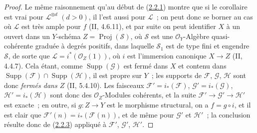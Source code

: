 \begin{proof}
Le même raisonnement qu'au début de
(\hyperref[III.2.2.1-fr]{2.2.1}) montre que si le corollaire est vrai
pour $\mathcal L^{\otimes d}$ $(d>0)$, il l'est aussi pour $\mathcal L$~;
on peut donc se borner au cas où $\mathcal L$ est très ample pour $f$
(II, 4.6.11), et par suite on peut identifier $X$ à un ouvert dans un
$Y$-schéma $Z=\operatorname{Proj}(\mathcal S)$, où $\mathcal S$ est une
$\mathcal O_Y$-Algèbre quasi-cohérente graduée à degrés positifs, dans
laquelle $\mathcal S_1$ est de type fini et engendre $\mathcal S$, de
sorte que $\mathcal L=i^*(\mathcal O_Z(1))$, où $i$ est l'immersion
canonique $X\to Z$ (II, 4.4.7). Cela étant, comme
$\operatorname{Supp}(\mathcal G)$ est fermé dans $X$ et contenu dans
$\operatorname{Supp}(\mathcal F)\cap\operatorname{Supp}(\mathcal H)$, il
est propre sur $Y$~; les supports de $\mathcal F$, $\mathcal G$,
$\mathcal H$ sont donc \emph{fermés dans $Z$} (II, 5.4.10). Les faisceaux
$\mathcal F'=i_*(\mathcal F)$, $\mathcal G'=i_*(\mathcal G)$,
$\mathcal H'=i_*(\mathcal H)$ sont donc des $\mathcal O_Z$-Modules
cohérents, et la suite $\mathcal F'\to\mathcal G'\to\mathcal H'$ est
exacte~; en outre, si $g:Z\to Y$ est le morphisme structural, on a
$f=g\circ i$, et il est clair que
$\mathcal F'(n)=i_*(\mathcal F(n))$, et de même pour $\mathcal G'$ et
$\mathcal H'$~; la conclusion résulte donc de
(\hyperref[III.2.2.3-fr]{2.2.3}) appliqué à
$\mathcal F'$, $\mathcal G'$, $\mathcal H'$.
\end{proof}


